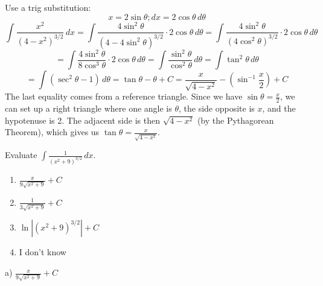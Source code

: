 \documentclass[addpoints,12pt,answers]{exam}
\begin{document}
\begin{questions}
\begin{solution}
    Use a trig substitution:    
    $$x=2\sin\theta; dx=2\cos\theta\,d\theta$$
    $$\int\frac{x^2}{(4-x^2)^{3/2}}\,dx=\int\frac{4\sin^2\theta}{(4-4\sin^2\theta)^{3/2}}\cdot 2\cos\theta\,d\theta=\int\frac{4\sin^2\theta}{(4\cos^2\theta)^{3/2}}\cdot 2\cos\theta\,d\theta$$
    $$=\int\frac{4\sin^2\theta}{8\cos^3\theta}\cdot 2\cos\theta\,d\theta=\int\frac{\sin^2\theta}{\cos^2\theta}\,d\theta=\int\tan^2\theta\,d\theta$$
    $$=\int(\sec^2\theta-1)\,d\theta=\tan\theta-\theta+C=\frac{x}{\sqrt{4-x^2}}-\left(\sin^{-1}\frac{x}{2}\right)+C$$
    The last equality comes from a reference triangle. Since we have $\displaystyle\sin\theta=\frac{x}{2}$, we can set up a right triangle where one angle is $\theta$, the side opposite is $x$, and the hypotenuse is 2. The adjacent side is then $\sqrt{4-x^2}$ (by the Pythagorean Theorem), which gives us $\displaystyle\tan\theta=\frac{x}{\sqrt{4-x^2}}$.
    \begin{center}
    \end{center}
  \end{solution}
  \newpage
  \question
  Evaluate $\displaystyle\int\frac{1}{(x^2+9)^{3/2}}\,dx$.
  \begin{enumerate}[label=\alph*)]
    \item
    $\displaystyle\frac{x}{9\sqrt{x^2+9}}+C$
    \item
    $\displaystyle\frac{1}{3\sqrt{x^2+9}}+C$
    \item
    $\displaystyle\ln|(x^2+9)^{3/2}|+C$
    \item
    I don't know
  \end{enumerate}
  \begin{solution}
    a) $\displaystyle\frac{x}{9\sqrt{x^2+9}}+C$
    

\end{solution}
\end{questions}
\end{document}
